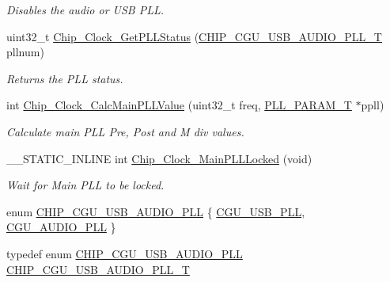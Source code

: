 \begin{DoxyCompactItemize}
\begin{DoxyCompactList}\small\item\em Disables the audio or U\+SB P\+LL. \end{DoxyCompactList}\item 
uint32\+\_\+t \hyperlink{group___c_l_o_c_k__18_x_x__43_x_x_gad2a40b92ab5d064cc655ae4ada1474b0}{Chip\+\_\+\+Clock\+\_\+\+Get\+P\+L\+L\+Status} (\hyperlink{group___c_l_o_c_k__18_x_x__43_x_x_ga839a458a9e1e2a85e68470156c861e6a}{C\+H\+I\+P\+\_\+\+C\+G\+U\+\_\+\+U\+S\+B\+\_\+\+A\+U\+D\+I\+O\+\_\+\+P\+L\+L\+\_\+T} pllnum)
\begin{DoxyCompactList}\small\item\em Returns the P\+LL status. \end{DoxyCompactList}\item 
int \hyperlink{group___c_l_o_c_k__18_x_x__43_x_x_ga1412ab2c1437f42f77ef96f321a0055b}{Chip\+\_\+\+Clock\+\_\+\+Calc\+Main\+P\+L\+L\+Value} (uint32\+\_\+t freq, \hyperlink{struct_p_l_l___p_a_r_a_m___t}{P\+L\+L\+\_\+\+P\+A\+R\+A\+M\+\_\+T} $\ast$ppll)
\begin{DoxyCompactList}\small\item\em Calculate main P\+LL Pre, Post and M div values. \end{DoxyCompactList}\item 
\+\_\+\+\_\+\+S\+T\+A\+T\+I\+C\+\_\+\+I\+N\+L\+I\+NE int \hyperlink{group___c_l_o_c_k__18_x_x__43_x_x_gae553f4ede5f7ac8401c16e9df9e37102}{Chip\+\_\+\+Clock\+\_\+\+Main\+P\+L\+L\+Locked} (void)
\begin{DoxyCompactList}\small\item\em Wait for Main P\+LL to be locked. \end{DoxyCompactList}\end{DoxyCompactItemize}
\begin{DoxyCompactItemize}
\item 
enum \hyperlink{group___c_l_o_c_k__18_x_x__43_x_x_gabdd04536f16b3c7b588757d024e53da6}{C\+H\+I\+P\+\_\+\+C\+G\+U\+\_\+\+U\+S\+B\+\_\+\+A\+U\+D\+I\+O\+\_\+\+P\+LL} \{ \hyperlink{group___c_l_o_c_k__18_x_x__43_x_x_ggabdd04536f16b3c7b588757d024e53da6a9c58406347e31448cf1af5069bfa8618}{C\+G\+U\+\_\+\+U\+S\+B\+\_\+\+P\+LL}, 
\hyperlink{group___c_l_o_c_k__18_x_x__43_x_x_ggabdd04536f16b3c7b588757d024e53da6a417d44002637aeeb1b62b42c39723cc1}{C\+G\+U\+\_\+\+A\+U\+D\+I\+O\+\_\+\+P\+LL}
 \}
\item 
typedef enum \hyperlink{group___c_l_o_c_k__18_x_x__43_x_x_gabdd04536f16b3c7b588757d024e53da6}{C\+H\+I\+P\+\_\+\+C\+G\+U\+\_\+\+U\+S\+B\+\_\+\+A\+U\+D\+I\+O\+\_\+\+P\+LL} \hyperlink{group___c_l_o_c_k__18_x_x__43_x_x_ga839a458a9e1e2a85e68470156c861e6a}{C\+H\+I\+P\+\_\+\+C\+G\+U\+\_\+\+U\+S\+B\+\_\+\+A\+U\+D\+I\+O\+\_\+\+P\+L\+L\+\_\+T}
\end{DoxyCompactItemize}
